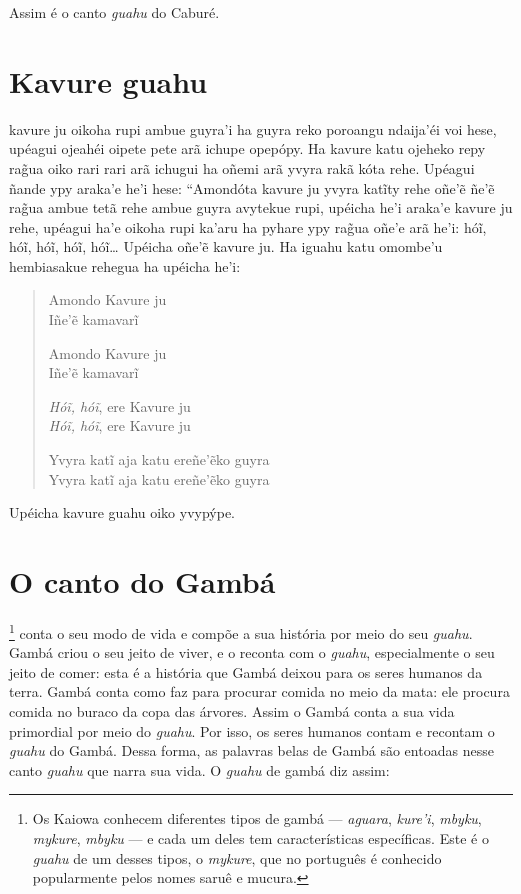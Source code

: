 Assim é o canto \textit{guahu} do Caburé.

\chapter{Kavure guahu}

 kavure ju oikoha rupi ambue guyra'i ha guyra reko poroangu
ndaija'éi voi hese, upéagui ojeahéi oipete pete arã ichupe opepópy. Ha
kavure katu ojeheko repy rag̃ua oiko rari rari arã ichugui ha oñemi arã
yvyra rakã kóta rehe. Upéagui ñande ypy araka'e he'i hese: ``Amondóta
kavure ju yvyra katĩty rehe oñe'ẽ ñe'ẽ rag̃ua ambue tetã rehe ambue guyra
avytekue rupi, upéicha he'i araka'e kavure ju rehe, upéagui ha'e oikoha
rupi ka'aru ha pyhare ypy rag̃ua oñe'e arã he'i: hóĩ, hóĩ, hóĩ, hóĩ,
hóĩ\ldots{} Upéicha oñe'ẽ kavure ju. Ha iguahu katu omombe'u hembiasakue
rehegua ha upéicha he'i:

\begin{verse}
Amondo Kavure ju\\
Iñe'ẽ kamavarĩ

Amondo Kavure ju\\
Iñe'ẽ kamavarĩ

\textit{Hóĩ, hóĩ}, ere Kavure ju\\
\textit{Hóĩ, hóĩ}, ere Kavure ju

Yvyra katĩ aja katu ereñe'ẽko guyra\\
Yvyra katĩ aja katu ereñe'ẽko guyra
\end{verse}

Upéicha kavure guahu oiko yvypýpe.

\chapter{O canto do Gambá}

\footnote{Os Kaiowa conhecem diferentes tipos de gambá ---
  \textit{aguara}, \textit{kure'i}, \textit{mbyku}, \textit{mykure},
  \textit{mbyku} --- e cada um deles tem características específicas. Este é
  o \textit{guahu} de um desses tipos, o \textit{mykure}, que no português é
  conhecido popularmente pelos nomes saruê e mucura.} conta o seu modo
de vida e compõe a sua história por meio do seu \textit{guahu}. Gambá
criou o seu jeito de viver, e o reconta com o \textit{guahu},
especialmente o seu jeito de comer: esta é a história que Gambá deixou
para os seres humanos da terra. Gambá conta como faz para procurar
comida no meio da mata: ele procura comida no buraco da copa das
árvores. Assim o Gambá conta a sua vida primordial por meio do
\textit{guahu}. Por isso, os seres humanos contam e recontam o
\textit{guahu} do Gambá. Dessa forma, as palavras belas de Gambá são
entoadas nesse canto \textit{guahu} que narra sua vida. O \textit{guahu} de
gambá diz assim:


